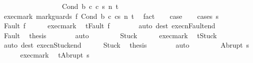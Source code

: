 \begin{isabellebody}
\ \ \ \ \ \ \isamarkupfalse%
\isanewline
\ \ \ \ \isamarkupfalse%
\isanewline
\ \ \isamarkupfalse%
\isanewline
{}\isamarkupfalse%
\isanewline
\ \ \isamarkupfalse%
\ {\isacharparenleft}Cond\ b\ c{}\ c{}\ s\ n\ t{\isacharparenright}\isanewline
\ \ \isamarkupfalse%
\ exec{\isacharunderscore}mark{\isacharcolon}\ {\isachardoublequoteopen}{\isasymGamma}{\isasymturnstile}{\isasymlangle}mark{\isacharunderscore}guards\ f\ {\isacharparenleft}Cond\ b\ c{}\ c{}{\isacharparenright}{\isacharcomma}s{\isasymrangle}\ {\isacharequal}n{\isasymRightarrow}\ t{\isachardoublequoteclose}\ \isamarkupfalse%
\ fact\isanewline
\ \ \isamarkupfalse%
\ {\isacharquery}case\isanewline
\ \ \isamarkupfalse%
\ {\isacharparenleft}cases\ s{\isacharparenright}\isanewline
\ \ \ \ \isamarkupfalse%
\ {\isacharparenleft}Fault\ f{\isacharparenright}\isanewline
\ \ \ \ \isamarkupfalse%
\ exec{\isacharunderscore}mark\ \isamarkupfalse%
\ {\isachardoublequoteopen}t{\isacharequal}Fault\ f{\isachardoublequoteclose}\isanewline
\ \ \ \ \ \ \isamarkupfalse%
\ {\isacharparenleft}auto\ dest{\isacharcolon}\ execn{\isacharunderscore}Fault{\isacharunderscore}end{\isacharparenright}\isanewline
\ \ \ \ \isamarkupfalse%
\ Fault\ \isamarkupfalse%
\ {\isacharquery}thesis\isanewline
\ \ \ \ \ \ \isamarkupfalse%
\ auto\isanewline
\ \ \isamarkupfalse%
\isanewline
\ \ \ \ \isamarkupfalse%
\ Stuck\isanewline
\ \ \ \ \isamarkupfalse%
\ exec{\isacharunderscore}mark\ \isamarkupfalse%
\ {\isachardoublequoteopen}t{\isacharequal}Stuck{\isachardoublequoteclose}\isanewline
\ \ \ \ \ \ \isamarkupfalse%
\ {\isacharparenleft}auto\ dest{\isacharcolon}\ execn{\isacharunderscore}Stuck{\isacharunderscore}end{\isacharparenright}\isanewline
\ \ \ \ \isamarkupfalse%
\ Stuck\ \isamarkupfalse%
\ {\isacharquery}thesis\isanewline
\ \ \ \ \ \ \isamarkupfalse%
\ auto\isanewline
\ \ \isamarkupfalse%
\isanewline
\ \ \ \ \isamarkupfalse%
\ {\isacharparenleft}Abrupt\ s{\isacharprime}{\isacharparenright}\isanewline
\ \ \ \ \isamarkupfalse%
\ exec{\isacharunderscore}mark\ \isamarkupfalse%
\ {\isachardoublequoteopen}t{\isacharequal}Abrupt\ s{\isacharprime}{\isachardoublequoteclose}\isanewline

\end{isabellebody}
